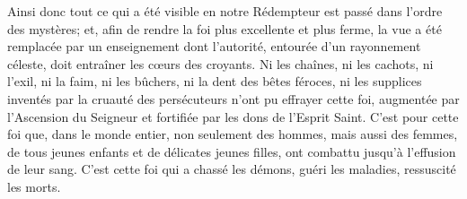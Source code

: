 Ainsi donc tout ce qui a été visible en notre Rédempteur
	est passé dans l’ordre des mystères;
	et, afin de rendre la foi plus excellente et plus ferme,
	la vue a été remplacée par un enseignement
	dont l’autorité, entourée d’un rayonnement céleste,
	doit entraîner les cœurs des croyants.
Ni les chaînes, ni les cachots, ni l’exil, ni la faim,
	ni les bûchers, ni la dent des bêtes féroces,
	ni les supplices inventés par la cruauté des persécuteurs
		n’ont pu effrayer cette foi,
	augmentée par l’Ascension du Seigneur
	et fortifiée par les dons de l’Esprit Saint.
C’est pour cette foi que, dans le monde entier,
	non seulement des hommes, mais aussi des femmes,
	de tous jeunes enfants et de délicates jeunes filles,
	ont combattu jusqu’à l’effusion de leur sang.
C’est cette foi qui a chassé les démons,
	guéri les maladies, ressuscité les morts.
